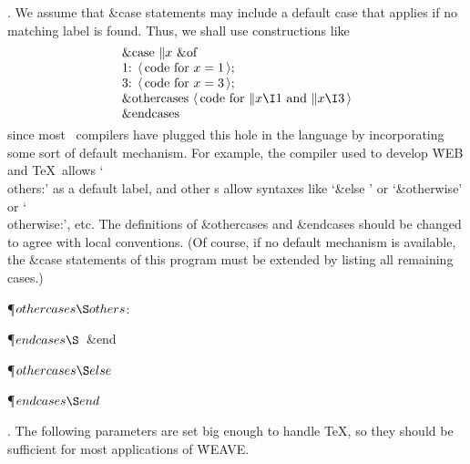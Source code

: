 . We assume that   \&{case}  statements may include a default case that
applies
if no matching label is found. Thus, we shall use constructions like
$$\vbox{\halign{#\hfil\cr
 \&{case} $\|x$ \&{of}\cr
1: $\langle\,$code for $x=1\,\rangle$;\cr
3: $\langle\,$code for $x=3\,\rangle$;\cr
 \&{othercases}  $\langle\,$code for $\|x\I1$ and $\|x\I3$$\,\rangle$\cr
  \&{endcases} \cr}}$$
since most \PASCAL\ compilers have plugged this hole in the language by
incorporating some sort of default mechanism. For example, the compiler
used to develop \.{WEB} and \TeX\ allows `\\{others}:' as a default label,
and other \PASCAL s allow syntaxes like `\ignorespaces \&{else} \unskip' or
`\&{otherwise}' or `\\{otherwise}:', etc. The definitions of  \&{othercases}
and   \&{endcases}  should be changed to agree with local conventions.
(Of course, if no default mechanism is available, the   \&{case}  statements of
this program must be extended by listing all remaining cases.)

\Y\P\D {}$\\{othercases}\S\\{others}$: \par
\P\D {}$\\{endcases}\S$\ \&{end} \par
\P\F {}$\\{othercases}\S\\{else}$\par
\P\F {}$\\{endcases}\S\\{end}$\par
\fi

. The following parameters are set big enough to handle \TeX, so they
should be sufficient for most applications of \.{WEAVE}.

